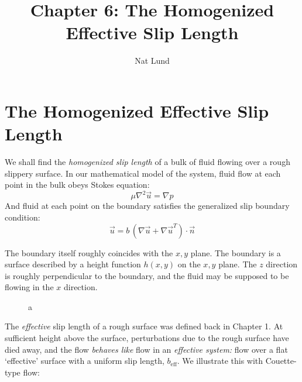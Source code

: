 \documentclass[12pt, a4paper, twoside, openright]{book}
\title{Chapter 6: The Homogenized Effective Slip Length}
\author{Nat Lund}
\newcommand{\beff}{\ensuremath{b_{\mathrm{eff}}}}
\begin{document}
\chapter{The Homogenized Effective Slip Length}

We shall find the \emph{homogenized slip length} of a bulk of fluid flowing over a rough slippery surface.  In our mathematical model of the system,
fluid flow at each point in the bulk obeys Stokes equation:
\begin{equation}
\mu \nabla^2 \vec{u} = \nabla p
\end{equation}
And fluid at each point on the boundary satisfies the generalized slip boundary condition:
\begin{equation}
\vec{u} = b \, (\nabla \vec{u} + \nabla \vec{u}^T) \cdot \vec{n}
\end{equation}

The boundary itself roughly coincides with the $x,y$ plane. The boundary is a surface described by a height function $h(x,y)$ on the $x,y$ plane.  The $z$ direction is roughly perpendicular to the boundary, and the fluid may be supposed to be flowing in the $x$ direction. 

\begin{figure}[ht]
\centering
{}
\caption{a}\label{a}
\end{figure}

The \emph{effective} slip length of a rough surface was defined back in Chapter 1.  At sufficient height above the surface, perturbations due to the rough surface have died away, and the flow \emph{behaves like} flow in an \emph{effective system:} flow over a flat `effective' surface with a uniform slip length, $\beff$. We illustrate this with Couette-type flow:
\end{document}
